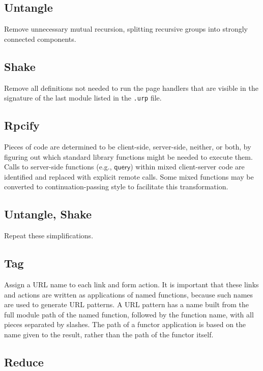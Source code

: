 \documentclass{article}
\newcommand{\mt}[1]{\mathsf{#1}}
\begin{document}
\subsection{Untangle}

Remove unnecessary mutual recursion, splitting recursive groups into strongly connected components.

\subsection{Shake}

Remove all definitions not needed to run the page handlers that are visible in the signature of the last module listed in the \texttt{.urp} file.

\subsection{Rpcify}

Pieces of code are determined to be client-side, server-side, neither, or both, by figuring out which standard library functions might be needed to execute them.  Calls to server-side functions (e.g., $\mt{query}$) within mixed client-server code are identified and replaced with explicit remote calls.  Some mixed functions may be converted to continuation-passing style to facilitate this transformation.

\subsection{Untangle, Shake}

Repeat these simplifications.

\subsection{\label{tag}Tag}

Assign a URL name to each link and form action.  It is important that these links and actions are written as applications of named functions, because such names are used to generate URL patterns.  A URL pattern has a name built from the full module path of the named function, followed by the function name, with all pieces separated by slashes.  The path of a functor application is based on the name given to the result, rather than the path of the functor itself.

\subsection{Reduce}
\end{document}
